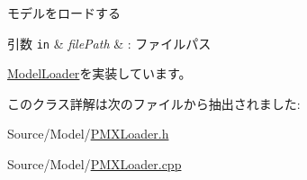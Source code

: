 モデルをロードする 
\begin{DoxyParams}[1]{引数}
\mbox{\tt in}  & {\em file\+Path} & \+: ファイルパス \\
\hline
\end{DoxyParams}


\mbox{\hyperlink{class_model_loader_a8e2157daa8d364c36fd26922f04adcb0}{Model\+Loader}}を実装しています。



このクラス詳解は次のファイルから抽出されました\+:\begin{DoxyCompactItemize}
\item 
Source/\+Model/\mbox{\hyperlink{_p_m_x_loader_8h}{P\+M\+X\+Loader.\+h}}\item 
Source/\+Model/\mbox{\hyperlink{_p_m_x_loader_8cpp}{P\+M\+X\+Loader.\+cpp}}\end{DoxyCompactItemize}
